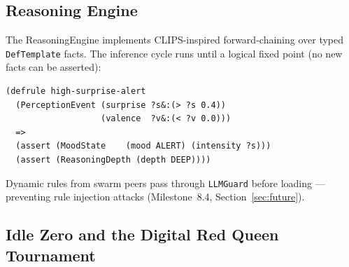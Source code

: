 \documentclass[12pt,a4paper]{article}
\begin{document}
\subsection{Reasoning Engine}

The ReasoningEngine implements CLIPS-inspired forward-chaining over typed \texttt{DefTemplate}
facts. The inference cycle runs until a logical fixed point (no new facts can be asserted):

\begin{lstlisting}[language={}, caption={CLIPS-pattern rule in ZANA's Rust DSL}]
(defrule high-surprise-alert
  (PerceptionEvent (surprise ?s&:(> ?s 0.4))
                   (valence  ?v&:(< ?v 0.0)))
  =>
  (assert (MoodState    (mood ALERT) (intensity ?s)))
  (assert (ReasoningDepth (depth DEEP))))
\end{lstlisting}

Dynamic rules from swarm peers pass through \texttt{LLMGuard} before loading --- preventing
rule injection attacks (Milestone~8.4, Section~\ref{sec:future}).

\subsection{Idle Zero and the Digital Red Queen Tournament}
\label{sec:redqueen}
\end{document}
